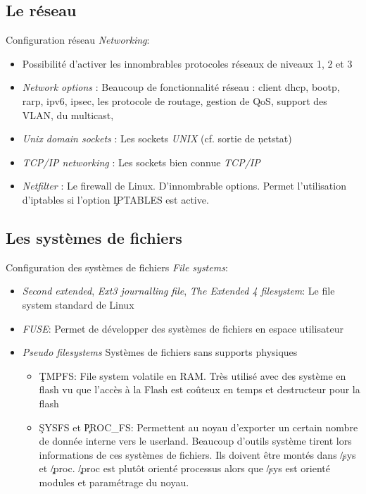 \subsection{Le réseau}

\begin{frame}[fragile=singleslide]{Configuration réseau}
  \emph{Networking}:
  \begin{itemize}
  \item Possibilité  d'activer les innombrables  protocoles réseaux de
    niveaux 1, 2 et 3
  \item  \emph{Network options} : Beaucoup  de fonctionnalité  réseau :
    client dhcp,  bootp, rarp, ipv6, ipsec, les  protocole de routage,
    gestion de QoS, support des VLAN, du multicast,
  \item   \emph{Unix  domain  sockets}   :  Les   sockets  \emph{UNIX}
    (cf. sortie de \c{netstat})
  \item   \emph{TCP/IP   networking}  :   Les   sockets  bien   connue
    \emph{TCP/IP}
  \item  \emph{Netfilter}  :  Le  firewall  de  Linux.   D'innombrable
    options.  Permet l'utilisation d'iptables si l'option \c{IPTABLES}
    est active.
  \end{itemize}
\end{frame}

\subsection{Les systèmes de fichiers}

\begin{frame}[fragile=singleslide]{Configuration des systèmes de fichiers}
  \emph{File systems}:
  \begin{itemize}
  \item   \emph{Second   extended},   \emph{Ext3  journalling   file},
    \emph{The Extended 4 filesystem}: Le file system standard de Linux
  \item \emph{FUSE}: Permet de  développer des systèmes de fichiers en
    espace utilisateur
  \item \emph{Pseudo  filesystems} Systèmes de  fichiers sans supports
    physiques
    \begin{itemize}
    \item \c{TMPFS}: File system  volatile en RAM.  Très utilisé avec
      des système en flash vu que  l'accès à la Flash est coûteux en
      temps et destructeur pour la flash
    \item \c{SYSFS} et \c{PROC_FS}:  Permettent au noyau d'exporter un
      certain  nombre de  donnée interne  vers le  userland.  Beaucoup
      d'outils  système tirent  lors informations  de ces  systèmes de
      fichiers.  Ils  doivent être montés dans  \c{/sys} et \c{/proc}.
      \c{/proc} est  plutôt orienté  processus alors que  \c{/sys} est
      orienté modules et paramétrage du noyau.
    \end{itemize}
  \end{itemize}
\end{frame}

